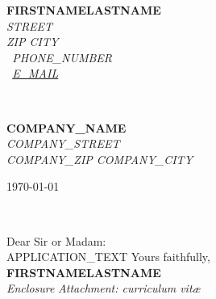 \documentclass[11pt]{article}
\def\firstname{{{FIRSTNAME}}}
\def\familyname{{{LASTNAME}}}
\def\fullname{\firstname \familyname}
\begin{document}
\rmfamily  %
\hfill%
\begin{minipage}[t]{.6\textwidth}
\raggedleft%
{\bfseries \fullname}\\[.35ex]
\small\itshape%
{{STREET}} \\
{{ZIP}} {{CITY}}\\[.35ex]
\Telefon~{{PHONE_NUMBER}}\\
\Letter~\href{mailto:{{E_MAIL}}}{{{E_MAIL}}}
\end{minipage}\\[1em]
%
\begin{minipage}[t]{.4\textwidth}
\raggedright%
{\bfseries {{COMPANY_NAME}}}\\[.35ex]
\small\itshape%
{{COMPANY_STREET}}\\
{{COMPANY_ZIP}} {{COMPANY_CITY}}
\end{minipage}
\hfill %
\begin{minipage}[t]{.4\textwidth}
\raggedleft %
\today
\end{minipage}\\[2em]
\raggedright
Dear Sir or Madam:\\[1.5em]

{{APPLICATION_TEXT}}
Yours faithfully,\\[2em] %
%
{\bfseries \fullname}\\
%
\vfill%
{\slshape Enclosure}
{\slshape Attachment: curriculum vit\ae{}}
\end{document}
